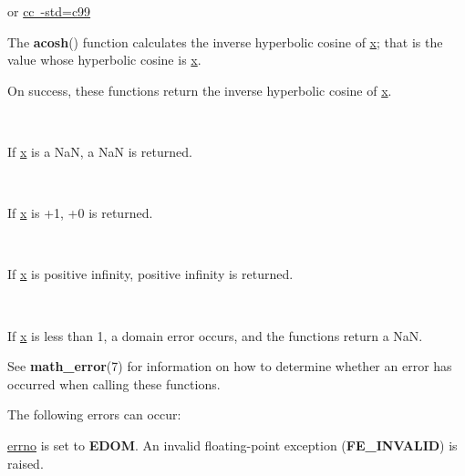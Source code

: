 \documentclass[]{article}
\let\realtextbf=\textbf
\renewcommand{\textbf}[1]{\textcolor{boldcolor}{\realtextbf{#1}}}
\renewcommand{\emph}[1]{\underline{#1}}
\begin{document}
or \emph{cc~-std=c99}


The \textbf{acosh}() function calculates the inverse hyperbolic cosine
of \emph{x}; that is the value whose hyperbolic cosine is \emph{x}.


On success, these functions return the inverse hyperbolic cosine of
\emph{x}.

~

If \emph{x} is a NaN, a NaN is returned.

~

If \emph{x} is +1, +0 is returned.

~

If \emph{x} is positive infinity, positive infinity is returned.

~

If \emph{x} is less than 1, a domain error occurs, and the functions
return a NaN.


See \textbf{math\_error}(7) for information on how to determine whether
an error has occurred when calling these functions.

The following errors can occur:

\begin{description}
\itemsep1pt\parskip0pt
\item[Domain error: \emph{x} is less than 1]
\emph{errno} is set to \textbf{EDOM}. An invalid floating-point
exception (\textbf{FE\_INVALID}) is raised.
\end{description}

\end{document}
